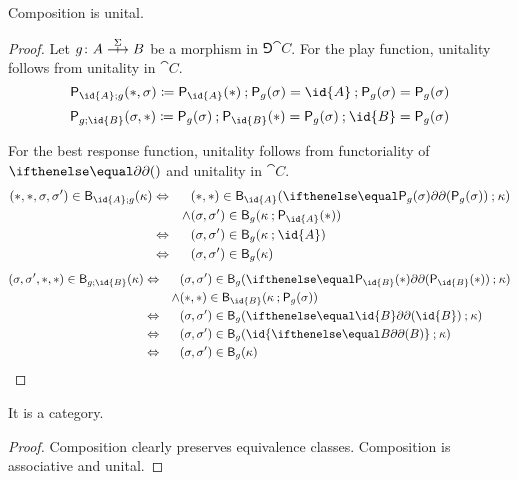 \begin{lemma}
  Composition is unital.
\end{lemma}
\begin{proof}
  Let \(g \colon A \gamearrow{\Sigma} B\) be a morphism in \(\Game{\cat{C}}\).
For the play function, unitality follows from unitality in \(\cat{C}\).
\[\play{\id{A} \dcomp g}(\ast,\sigma) \defn \play{\id{A}}(\ast) \dcomp \play{g}(\sigma) = \id{A} \dcomp \play{g}(\sigma) = \play{g}(\sigma) \]
\[\play{g \dcomp \id{B}}(\sigma,\ast) \defn \play{g}(\sigma) \dcomp \play{\id{B}}(\ast) = \play{g}(\sigma) \dcomp \id{B} = \play{g}(\sigma)\]

For the best response function, unitality follows from functoriality of \(\delay\) and unitality in \(\cat{C}\).
\begin{align*} (\ast,\ast,\sigma,\sigma') \in \best{\id{A} \dcomp g}(\kappa) &\iff && (\ast,\ast) \in \best{\id{A}}(\delay[\play{g}(\sigma)] \dcomp \kappa)\\
&&\land& (\sigma,\sigma') \in \best{g}(\kappa \dcomp \play{\id{A}}(\ast))\\
&\iff && (\sigma,\sigma') \in \best{g}(\kappa \dcomp \id{A})\\
&\iff && (\sigma,\sigma') \in \best{g}(\kappa)
\end{align*}
\begin{align*} (\sigma,\sigma',\ast,\ast) \in \best{g \dcomp \id{B}}(\kappa) &\iff &&  (\sigma,\sigma') \in \best{g}(\delay[\play{\id{B}}(\ast)] \dcomp \kappa)\\
&&\land& (\ast,\ast) \in \best{\id{B}}(\kappa \dcomp \play{g}(\sigma))\\
&\iff && (\sigma,\sigma') \in \best{g}(\delay[\id{B}] \dcomp \kappa)\\
&\iff && (\sigma,\sigma') \in \best{g}(\id{\delay[B]} \dcomp \kappa)\\
&\iff && (\sigma,\sigma') \in \best{g}(\kappa)
\end{align*}
\end{proof}

\begin{proposition}
  It is a category.
\end{proposition}
\begin{proof}
  Composition clearly preserves equivalence classes.
  Composition is associative and unital.
\end{proof}

